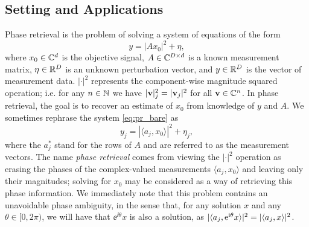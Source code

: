 \subsection{Setting and Applications}
\label{sec:intro_setting}
Phase retrieval is the problem of solving a system of equations of the form \begin{equation} y = |A x_0|^2 + \eta, \label{eq:pr_bare} \end{equation} where $x_0 \in \mathbb{C}^d$ is the objective signal, $A \in \mathbb{C}^{D \times d}$ is a known measurement matrix, $\eta \in \mathbb{R}^D$ is an unknown perturbation vector, and $y \in \mathbb{R}^D$ is the vector of measurement data.  $|\cdot|^2$ represents the component-wise magnitude squared operation; i.e. for any $n \in \mathbb{N}$ we have $|\mathbf v|^2_j = |\mathbf v_j|^2$ for all $\mathbf v \in \mathbb{C}^n$.  In phase retrieval, the goal is to recover an estimate of $x_0$ from knowledge of $y$ and $A$.  We sometimes rephrase the system \eqref{eq:pr_bare} as \begin{equation} y_j = | \langle a_j, x_0 \rangle |^2 + \eta_j,\label{eq:pr}\end{equation} where the $a_j^*$ stand for the rows of $A$ and are referred to as the measurement vectors.  The name \emph{phase retrieval} comes from viewing the $|\cdot|^2$ operation as erasing the phases of the complex-valued measurements $\langle a_j, x_0 \rangle$ and leaving only their magnitudes; solving for $x_0$ may be considered as a way of retrieving this phase information.  We immediately note that this problem contains an unavoidable phase ambiguity, in the sense that, for any solution $x$ and any $\theta \in [0, 2\pi)$, we will have that $\ee^{\ii \theta} x$ is also a solution, as $\lvert\langle a_j, \mathrm{e}^{\mathrm{i} \theta} x\rangle\rvert^2 = \lvert\langle a_j, x\rangle\rvert^2$.

